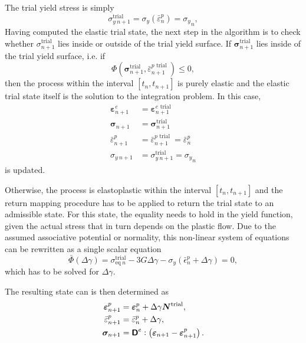 The trial yield stress is simply
\begin{equation}
\sigma_{y\:n+1}^{\text {trial }}=\sigma_{y}\left(\bar{\varepsilon}_{n}^{p}\right)={\sigma_{y}}_n,
\end{equation}
Having computed the elastic trial state, the next step in the algorithm is to check whether \(\sigma_{n+1}^{\text {trial }}\) lies inside or outside of the trial yield surface.
If \(\bm \sigma_{n+1}^{\text {trial }}\) lies inside of the trial yield surface, i.e. if
\begin{equation}
\Phi\left(\bm \sigma_{n+1}^{\text {trial }},\bar{\varepsilon}_{n+1}^{p \text { trial }} \right) \leq 0,
\end{equation}
then the process within the interval \(\left[t_{n}, t_{n+1}\right]\) is purely elastic and the elastic trial state itself is the solution to the integration problem. In this case,
\begin{align}
\bm\varepsilon_{n+1}^{e}&=\bm\varepsilon_{n+1}^{e \text { trial }} \\
\bm\sigma_{n+1}&=\bm\sigma_{n+1}^{\text {trial }} \\
\bar{\varepsilon}_{n+1}^{p}&=\bar{\varepsilon}_{n+1}^{p \text { trial }}=\bar{\varepsilon}_{n}^{p} \\
\sigma_{y\:n+1}&=\sigma_{y\:n+1}^{\text {trial }}={\sigma_{y}}_n
\end{align}
is updated.

Otherwise, the process is elastoplastic within the interval \(\left[t_{n}, t_{n+1}\right]\) and the return mapping procedure has to be applied to return the trial state to an admissible state.
For this state, the equality needs to hold in the yield function, given the actual stress that in turn depends on the plastic flow.
Due to the assumed associative potential or normality, this non-linear system of equations can be rewritten as a single scalar equation
\begin{equation}
\bar{\Phi}(\Delta \gamma)= \sigma_{\text{eq}\:n}^\text{trial}-3 G \Delta \gamma-\sigma_y(\bar{\epsilon}_n^p+\Delta \gamma)=0,
\end{equation}
which has to be solved for \(\Delta \gamma\).

The resulting state can is then determined as
\begin{align}
\bm\varepsilon^p_{n+1}&=\bm\varepsilon^p_n+\Delta \gamma \bm{N}^\text{trial}, \\
\bar{\varepsilon}^p_{n+1}&=\bar{\varepsilon}^p_n+\Delta \gamma,\\
\bm\sigma_{n+1}&=\boldsymbol{\mathsf{D}}^e:\left(\bm\varepsilon_{n+1}-\bm\varepsilon^p_ {n+1}\right).
\end{align}



